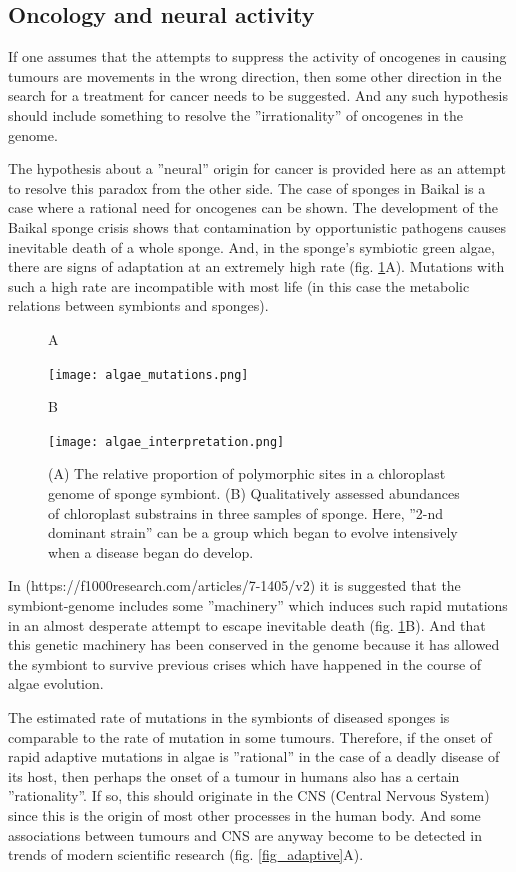\documentclass[12pt,aps]{revtex4}
\begin{document}
\subsection{Oncology and neural activity}

If one assumes that the attempts to suppress the activity of oncogenes in causing
tumours are movements in the wrong direction, then some other direction in the
search for a treatment for cancer needs to be suggested. And any such hypothesis
should include something to resolve the ''irrationality'' of oncogenes in the genome.

The hypothesis about a ''neural'' origin for cancer is provided here as an attempt to
resolve this paradox from the other side. The case of sponges in Baikal is a case
where a rational need for oncogenes can be shown. The development of the Baikal
sponge crisis shows that contamination by opportunistic pathogens causes inevitable
death of a whole sponge. And, in the sponge’s symbiotic green algae, there are signs
of adaptation at an extremely high rate (fig. \ref{fig_algae}A). Mutations with such a high rate
are incompatible with most life (in this case the metabolic relations between
symbionts and sponges).

\begin{figure}[h]
\flushleft \large \textsf{A}\\
\vskip 6pt
\centerline{\texttt{[image: algae\_mutations.png]}}
\flushleft \large \textsf{B}\\
\vskip 6pt
\centerline{\texttt{[image: algae\_interpretation.png]}}
\caption{(A) The relative proportion of polymorphic sites in a chloroplast genome of
sponge symbiont. (B) Qualitatively assessed abundances of chloroplast substrains in
three samples of sponge. Here, ''2-nd dominant strain'' can be a group which began to evolve intensively when a disease began do develop.}
\label{fig_algae}
\end{figure}

In (https://f1000research.com/articles/7-1405/v2) it is suggested that the
symbiont-genome includes some ''machinery'' which induces such rapid mutations in an
almost desperate attempt to escape inevitable death (fig. \ref{fig_algae}B). And that this
genetic machinery has been conserved in the genome because it has allowed the
symbiont to survive previous crises which have happened in the course of algae
evolution.

The estimated rate of mutations in the symbionts of diseased sponges is comparable
to the rate of mutation in some tumours. Therefore, if the onset of rapid adaptive
mutations in algae is ''rational'' in the case of a deadly disease of its host, then
perhaps the onset of a tumour in humans also has a certain ''rationality''. If so,
this should originate in the CNS (Central Nervous System) since this is the origin
of most other processes in the human body. And some associations between tumours and CNS are anyway become to be detected in trends of modern scientific research (fig. \ref{fig_adaptive}A). 
\end{document}
